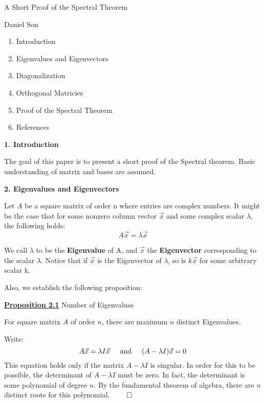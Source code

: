 \documentclass{article}
\newcommand{\new}[1]{
    \vspace{2mm}
    \noindent
    \textbf{
    \underline{#1}}
}
\newcommand{\textAnd}{
    {
        \hspace{5mm}
        \textrm{and}
        \hspace{5mm}
    }
}
\begin{document}
\begin{center}
\LARGE
A Short Proof of the Spectral Theorem

\Large
Daniel Son
\end{center}

\normalsize


\begin{enumerate}
    \item Introduction
    \item Eigenvalues and Eigenvectors
    \item Diagonalization
    \item Orthogonal Matricies
    \item Proof of the Spectral Theorem
    \item References
\end{enumerate}

\vspace{15mm}

\textbf{1. Introduction}

The goal of this paper is to present a short proof of the Spectral 
theorem. Basic understanding of matrix and bases are assumed. 

\vspace{15mm}

\textbf{2. Eigenvalues and Eigenvectors}

Let $A$ be a square matrix of order n where entries are complex numbers. 
It might be the case that
 for some nonzero column vector $\vec{x}$ and some complex scalar $\lambda$, 
the following holds:
\[
    A \vec{x} = \lambda \vec{x}
\]

We call $\lambda$ to be the \textbf{Eigenvalue} of A, and $\vec{x}$ 
the \textbf{Eigenvector} corresponding to the scalar $\lambda$. 
Notice that if $\vec{x}$ is the Eigenvector of $\lambda$, so is $k\vec{x}$
for some arbitrary scalar k. 

Also, we establish the following proposition:

\new{Proposition 2.1} Number of Eigenvalues

For square matrix $A$ of order $n$, there are maximum $n$ distinct 
Eigenvalues. 

\proof 
Write:
\[
    A\vec{x} = \lambda I \vec{x} 
    \textAnd 
    (A - \lambda I) \vec{x} = 0
\]
This equation holds only if the matrix $A - \lambda I$ is singular. 
In order for this to be possible, the determinant of $A - \lambda I$ 
must be zero. In fact, the determinant is some polynomial of degree $n$. 
By the fundamental theorem of algebra, there are $n$ distinct roots 
for this polynomial. $\qed$
\end{document}
